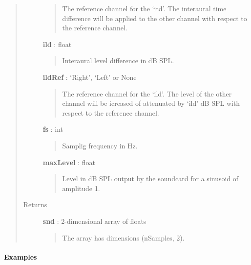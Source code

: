 \documentclass[a4paper,12pt,english]{sphinxmanual}
\begin{document}
\begin{fulllineitems}
\begin{quote}
\begin{description}
\begin{quote}
The reference channel for the `itd'. The interaural time
difference will be applied to the other channel with
respect to the reference channel.
\end{quote}

\textbf{ild} : float
\begin{quote}

Interaural level difference in dB SPL.
\end{quote}

\textbf{ildRef} : `Right', `Left' or None
\begin{quote}

The reference channel for the `ild'.
The level of the other channel will be
icreased of attenuated by `ild' dB SPL
with respect to the reference channel.
\end{quote}

\textbf{fs} : int
\begin{quote}

Samplig frequency in Hz.
\end{quote}

\textbf{maxLevel} : float
\begin{quote}

Level in dB SPL output by the soundcard for a sinusoid of amplitude 1.
\end{quote}

\item[{Returns }] \leavevmode
\textbf{snd} : 2-dimensional array of floats
\begin{quote}

The array has dimensions (nSamples, 2).
\end{quote}

\end{description}\end{quote}
\paragraph{Examples}


\end{fulllineitems}
\end{document}
